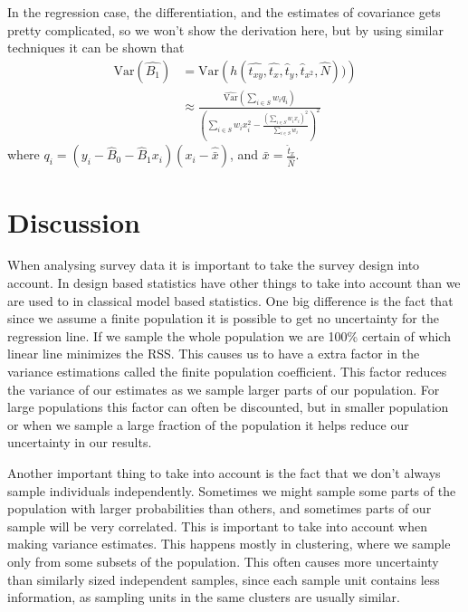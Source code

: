 \documentclass{article}
\begin{document}
In the regression case, the differentiation, and the estimates of covariance
gets pretty complicated, so we won't show the derivation here, but by using
similar techniques it can be shown that
\begin{align*}
 \mathrm{Var}(\hat{B_1})
 &= \mathrm{Var} \left( h(\hat{t_{xy}}, \hat{t_x},
 \hat{t}_y, \hat{t}_{x^2}, \hat{N})) \right) \\
 &\approx \frac{\widehat{\mathrm{Var}}\left( \sum_{i \in S} w_i q_i \right)}
   {\left( \sum_{i \in S} w_i x_i^2 - \frac{\left( \sum_{i \in S} w_i x_i \right)^2}{\sum_{i \in S} w_i} \right)^2}
\end{align*}
where \(q_i = (y_i - \hat{B}_0 - \hat{B}_1 x_i)(x_i - \hat{\bar{x}})\), and
\(\bar{x} = \frac{\hat{t}_x}{\hat{N}}\).



\section{Discussion}

When analysing survey data it is important to take the survey design into
account. In design based statistics have other things to take into account than
we are used to in classical model based statistics. One big difference is the
fact that since we assume a finite population it is possible to get no
uncertainty for the regression line. If we sample the whole population we are
100\% certain of which linear line minimizes the RSS. This causes us to have a
extra factor in the variance estimations called the finite population
coefficient. This factor reduces the variance of our estimates as we sample
larger parts of our population. For large populations this factor can often be
discounted, but in smaller population or when we sample a large fraction of the
population it helps reduce our uncertainty in our results.

Another important thing to take into account is the fact that we don't always
sample individuals independently. Sometimes we might sample some parts of the
population with larger probabilities than others, and sometimes parts of our
sample will be very correlated. This is important to take into account when
making variance estimates. This happens mostly in clustering, where we sample
only from some subsets of the population. This often causes more uncertainty
than similarly sized independent samples, since each sample unit contains less
information, as sampling units in the same clusters are usually similar.
\end{document}
